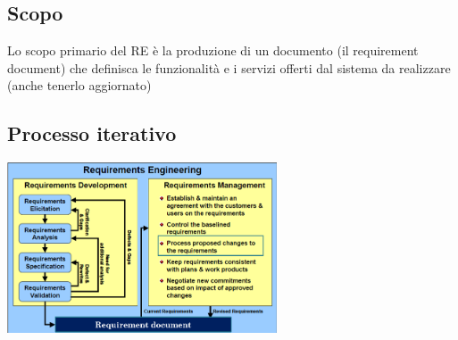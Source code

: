 \documentclass[12pt, a4paper]{report}
\begin{document}
\subsection{Scopo}
Lo scopo primario del RE è la produzione di un documento (il requirement document) che definisca le funzionalità e i servizi offerti dal sistema da realizzare (anche tenerlo aggiornato)
\subsection{Processo iterativo}
\begin{center}
    \includegraphics[width=0.6\textwidth]{Immagini/reiterativo.png}
\end{center}
\end{document}
